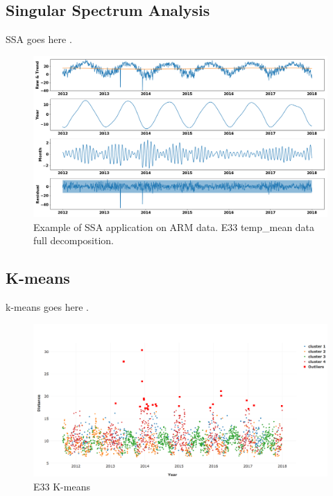 \documentclass[letterpaper, 10 pt, conference]{ieeeconf}  %
\begin{document}
\subsection{Singular Spectrum Analysis}
SSA goes here \cite{golyandina2013singular, alexandrov2008method}.
\begin{figure}[ht]
    \centering
    \includegraphics[width=\textwidth]{E33.png}
    \caption{Example of SSA application on ARM data. E33 temp\_mean data full 
    decomposition.}
    \label{fig:ssa}
\end{figure}

\subsection{K-means}
k-means goes here \cite{hartigan1979algorithm}.
\begin{figure}[ht]
    \centering
    \includegraphics[width=\textwidth]{kmeans.png}
    \caption{E33 K-means}
    \label{fig:kmeans}
\end{figure}
\end{document}
